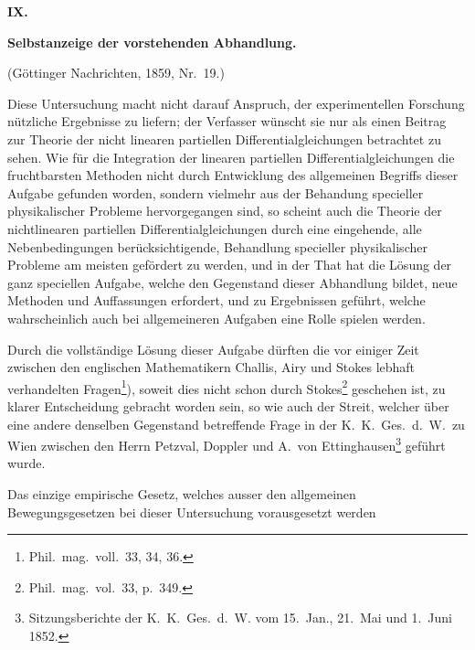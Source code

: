 \documentclass[12pt,a4paper]{article}
\begin{document}
\newpage
\begin{center}
\Large\textbf{IX.}
\end{center}
\vspace{-0.5em}
\begin{center}
\Large\textbf{Selbstanzeige der vorstehenden Abhandlung.}
\end{center}
\vspace{0.3em}
\begin{center}
\small (G\"ottinger Nachrichten, 1859, Nr.~19.)
\end{center}

\bigskip

Diese Untersuchung macht nicht darauf Anspruch, der experimentellen Forschung n\"utzliche Ergebnisse zu liefern; der Verfasser w\"unscht sie nur als einen Beitrag zur Theorie der nicht linearen partiellen Differentialgleichungen betrachtet zu sehen. Wie f\"ur die Integration der linearen partiellen Differentialgleichungen die fruchtbarsten Methoden nicht durch Entwicklung des allgemeinen Begriffs dieser Aufgabe gefunden worden, sondern vielmehr aus der Behandung specieller physikalischer Probleme hervorgegangen sind, so scheint auch die Theorie der nichtlinearen partiellen Differentialgleichungen durch eine eingehende, alle Nebenbedingungen ber\"ucksichtigende, Behandlung specieller physikalischer Probleme am meisten gef\"ordert zu werden, und in der That hat die L\"osung der ganz speciellen Aufgabe, welche den Gegenstand dieser Abhandlung bildet, neue Methoden und Auffassungen erfordert, und zu Ergebnissen gef\"uhrt, welche wahrscheinlich auch bei allgemeineren Aufgaben eine Rolle spielen werden.

Durch die vollst\"andige L\"osung dieser Aufgabe d\"urften die vor einiger Zeit zwischen den englischen Mathematikern Challis, Airy und Stokes lebhaft verhandelten Fragen\footnote{Phil.~mag.~voll.~33, 34, 36.}), soweit dies nicht schon durch Stokes\footnote{Phil.~mag.~vol.~33, p.~349.} geschehen ist, zu klarer Entscheidung gebracht worden sein, so wie auch der Streit, welcher \"uber eine andere denselben Gegenstand betreffende Frage in der K.~K.~Ges.~d.~W.~zu Wien zwischen den Herrn Petzval, Doppler und A.~von Ettinghausen\footnote{Sitzungsberichte der K.~K.~Ges.~d.~W. vom 15.~Jan., 21.~Mai und 1.~Juni 1852.} gef\"uhrt wurde.

Das einzige empirische Gesetz, welches ausser den allgemeinen Bewegungsgesetzen bei dieser Untersuchung vorausgesetzt werden
\end{document}
